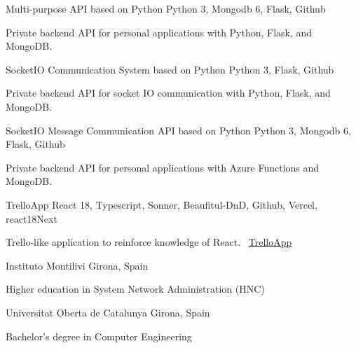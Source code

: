 \documentclass[]{awesome-cv}
\begin{document}
\begin{cventries}
    \cventry
    {}
    {Multi-purpose API based on Python}
    {Python 3, Mongodb 6, Flask, Github}
    {}
    {\begin{cvitems}
        \item {Private backend API for personal applications with Python, Flask, and MongoDB.}
    \end{cvitems}}

    \cventry
    {}
    {SocketIO Communication System based on Python}
    {Python 3, Flask, Github}
    {}
    {\begin{cvitems}
        \item {Private backend API for socket IO communication with Python, Flask, and MongoDB.}
    \end{cvitems}}

    \cventry
    {}
    {SocketIO Message Communication API based on Python}
    {Python 3, Mongodb 6, Flask, Github}
    {}
    {\begin{cvitems}
        \item {Private backend API for personal applications with Azure Functions and MongoDB.}
    \end{cvitems}}

    \cventry
    {}
    {TrelloApp}
    {React 18, Typescript, Sonner, Beaufitul-DnD, Github, Vercel, react18Next}
    {}
    {\begin{cvitems}
        \item {Trello-like application to reinforce knowledge of React.
        \newline \faLink\ \href{https://trello-app-giacconidev.vercel.app/user/login}{TrelloApp}}
    \end{cvitems}}
    \vspace{25mm}
\end{cventries}

\begin{cventries}
    \cventry
    {}
    {Instituto Montilivi}
    {Girona, Spain}
    {}
    {\begin{cvitems}
        \item {Higher education in System Network Administration (HNC)}
    \end{cvitems}}

    \cventry
    {}
    {Universitat Oberta de Catalunya}
    {Girona, Spain}
    {}
    {\begin{cvitems}
        \item {Bachelor's degree in Computer Engineering}
    \end{cvitems}}
\end{cventries}
\end{document}
